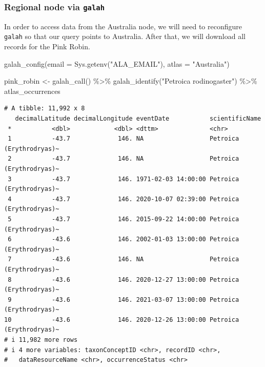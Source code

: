 \documentclass[
  letterpaper,
  DIV=11,
  numbers=noendperiod,
  oneside]{scrreprt}
\newenvironment{Shaded}{\begin{snugshade}}{\end{snugshade}}
\newcommand{\AttributeTok}[1]{\textcolor[rgb]{0.40,0.45,0.13}{#1}}
\newcommand{\FunctionTok}[1]{\textcolor[rgb]{0.28,0.35,0.67}{#1}}
\newcommand{\NormalTok}[1]{\textcolor[rgb]{0.00,0.23,0.31}{#1}}
\newcommand{\OtherTok}[1]{\textcolor[rgb]{0.00,0.23,0.31}{#1}}
\newcommand{\SpecialCharTok}[1]{\textcolor[rgb]{0.37,0.37,0.37}{#1}}
\newcommand{\StringTok}[1]{\textcolor[rgb]{0.13,0.47,0.30}{#1}}
\begin{document}
\hypertarget{regional-node-via-galah}{%
\subsubsection{\texorpdfstring{Regional node via
\texttt{galah}}{Regional node via galah}}\label{regional-node-via-galah}}

In order to access data from the Australia node, we will need to
reconfigure \texttt{galah} so that our query points to Australia. After
that, we will download all records for the Pink Robin.

\begin{Shaded}
\begin{Highlighting}[]
\FunctionTok{galah\_config}\NormalTok{(}\AttributeTok{email =} \FunctionTok{Sys.getenv}\NormalTok{(}\StringTok{"ALA\_EMAIL"}\NormalTok{), }
             \AttributeTok{atlas =} \StringTok{"Australia"}\NormalTok{)}

\NormalTok{pink\_robin }\OtherTok{\textless{}{-}} \FunctionTok{galah\_call}\NormalTok{() }\SpecialCharTok{\%\textgreater{}\%} 
  \FunctionTok{galah\_identify}\NormalTok{(}\StringTok{"Petroica rodinogaster"}\NormalTok{) }\SpecialCharTok{\%\textgreater{}\%} 
\NormalTok{  atlas\_occurrences}
\end{Highlighting}
\end{Shaded}

\begin{verbatim}
# A tibble: 11,992 x 8
   decimalLatitude decimalLongitude eventDate           scientificName          
 *           <dbl>            <dbl> <dttm>              <chr>                   
 1           -43.7             146. NA                  Petroica (Erythrodryas)~
 2           -43.7             146. NA                  Petroica (Erythrodryas)~
 3           -43.7             146. 1971-02-03 14:00:00 Petroica (Erythrodryas)~
 4           -43.7             146. 2020-10-07 02:39:00 Petroica (Erythrodryas)~
 5           -43.7             146. 2015-09-22 14:00:00 Petroica (Erythrodryas)~
 6           -43.6             146. 2002-01-03 13:00:00 Petroica (Erythrodryas)~
 7           -43.6             146. NA                  Petroica (Erythrodryas)~
 8           -43.6             146. 2020-12-27 13:00:00 Petroica (Erythrodryas)~
 9           -43.6             146. 2021-03-07 13:00:00 Petroica (Erythrodryas)~
10           -43.6             146. 2020-12-26 13:00:00 Petroica (Erythrodryas)~
# i 11,982 more rows
# i 4 more variables: taxonConceptID <chr>, recordID <chr>,
#   dataResourceName <chr>, occurrenceStatus <chr>
\end{verbatim}
\end{document}
